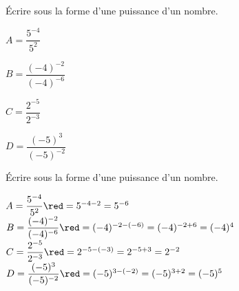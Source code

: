 \begin{exercice*}    
    Écrire sous la forme d'une puissance d'un nombre.
    \begin{multicols}{2}
        \begin{spacing}{2}
            $A=\dfrac{5^{-4}}{5^2}$

            $B=\dfrac{(-4)^{-2}}{(-4)^{-6}}$

            \columnbreak
            $C=\dfrac{2^{-5}}{2^{-3}}$

            $D=\dfrac{(-5)^{3}}{(-5)^{-2}}$
        \end{spacing}
    \end{multicols}
\end{exercice*}
\begin{corrige}
    Écrire sous la forme d'une puissance d'un nombre.
        \begin{spacing}{2}
            $A=\dfrac{5^{-4}}{5^2}          {\red = 5^{-4-2} = 5^{-6}}$
            $B=\dfrac{(-4)^{-2}}{(-4)^{-6}} {\red = (-4)^{-2-(-6)} = (-4)^{-2+6} = (-4)^4}$            
            $C=\dfrac{2^{-5}}{2^{-3}}       {\red = 2^{-5-(-3)} = 2^{-5+3} = 2^{-2}}$            
            $D=\dfrac{(-5)^{3}}{(-5)^{-2}}  {\red = (-5)^{3-(-2)} = (-5)^{3+2} = (-5)^5}$
        \end{spacing}
\end{corrige}

